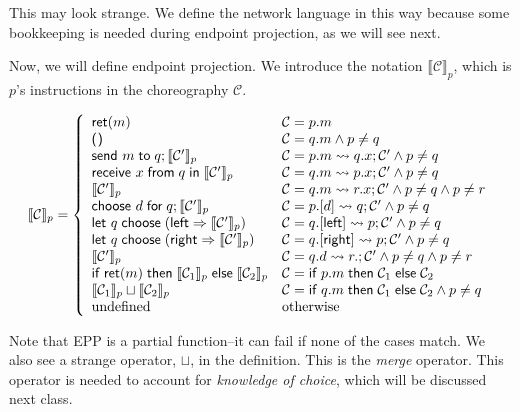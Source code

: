\documentclass{lecturenotes}
\newcommand{\unit}{\ensuremath{\textsf{(}\mkern0.5mu\textsf{)}}}
\newcommand{\ite}[3]{\ensuremath{\textsf{if}~#1 \mathrel{\textsf{then}} #2 \mathrel{\textsf{else}} #3}}
\newcommand{\send}[2]{\ensuremath{\textsf{send}~#1 \mathrel{\textsf{to}} #2}}
\newcommand{\recv}[3]{\ensuremath{\textsf{receive}~#1 \mathrel{\textsf{from}} #2} \mathrel{\textsf{in}} #3}
\newcommand{\Left}{\textsf{left}\xspace}
\newcommand{\Right}{\textsf{right}\xspace}
\newcommand{\choosefor}[2]{\ensuremath{\textsf{choose}~#1 \mathrel{\textsf{for}} #2}}
\newcommand{\letchooseL}[2]{\ensuremath{\textsf{let}~#1 \mathrel{\textsf{choose}} (\Left \Rightarrow #2)}}
\newcommand{\letchooseR}[2]{\ensuremath{\textsf{let}~#1 \mathrel{\textsf{choose}} (\Right \Rightarrow #2)}}
\newcommand{\ret}[1]{\ensuremath{\textsf{ret}(#1)}}
\newcommand{\sendrecv}[4]{\ensuremath{#1.#2 \rightsquigarrow #3.#4}}
\newcommand{\syncmsg}[3]{\ensuremath{#1.[#2] \rightsquigarrow #3}}
\newcommand{\chorif}[4]{\ensuremath{\textsf{if}~#1.#2 \mathrel{\textsf{then}} #3 \mathrel{\textsf{else}} #4}}
\newcommand{\projection}[2]{\ensuremath{\llbracket #1 \rrbracket_{#2}}}
\begin{document}
This may look strange.
We define the network language in this way because some bookkeeping is needed during endpoint projection, as we will see next.

Now, we will define endpoint projection.
We introduce the notation $\projection{\mathcal{C}}{p}$, which is $p$'s instructions in the choreography $\mathcal{C}$.

$$
\projection{\mathcal{C}}{p} = \left\{\begin{array}{ll}
  \ret{m} & \mathcal{C} = p.m\\
  \unit & \mathcal{C} = q.m \land p \neq q\\
  \send{m}{q}; \projection{\mathcal{C}'}{p} & \mathcal{C} = \sendrecv{p}{m}{q}{x}; \mathcal{C}' \land p \neq q\\
  \recv{x}{q}{\projection{\mathcal{C}'}{p}} & \mathcal{C} = \sendrecv{q}{m}{p}{x}; \mathcal{C}' \land p \neq q\\
  \projection{\mathcal{C}'}{p} & \mathcal{C} = \sendrecv{q}{m}{r}{x}; \mathcal{C}' \land p \neq q \land p \neq r\\
  \choosefor{d}{q}; \projection{\mathcal{C}'}{p} & \mathcal{C} = \syncmsg{p}{d}{q}; \mathcal{C}' \land p \neq q\\
  \letchooseL{q}{\projection{\mathcal{C}'}{p}} & \mathcal{C} = \syncmsg{q}{\Left}{p}; \mathcal{C}' \land p \neq q\\
  \letchooseR{q}{\projection{\mathcal{C}'}{p}} & \mathcal{C} = \syncmsg{q}{\Right}{p}; \mathcal{C}' \land p \neq q\\
  \projection{\mathcal{C}'}{p} & \mathcal{C} = \sendrecv{q}{d}{r}; \mathcal{C}' \land p \neq q \land p \neq r\\
  \ite{\ret{m}}{\projection{\mathcal{C}_1}{p}}{\projection{\mathcal{C}_2}{p}} & \mathcal{C} = \chorif{p}{m}{\mathcal{C}_1}{\mathcal{C}_2}\\
  \projection{\mathcal{C}_1}{p} \sqcup \projection{\mathcal{C}_2}{p} & \mathcal{C} = \chorif{q}{m}{\mathcal{C}_1}{\mathcal{C}_2} \land p \neq q\\
  \text{undefined} & \text{otherwise}
  \end{array}\right.
$$

Note that EPP is a partial function--it can fail if none of the cases match.
We also see a strange operator, $\sqcup$, in the definition.
This is the \emph{merge} operator.
This operator is needed to account for \emph{knowledge of choice}, which will be discussed next class.
\end{document}
